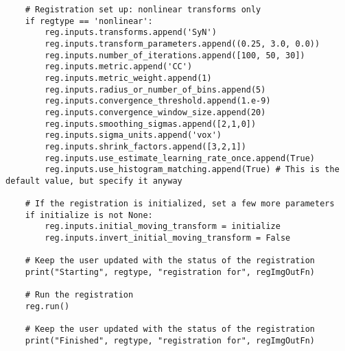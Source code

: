 \begin{lstlisting}
    # Registration set up: nonlinear transforms only
    if regtype == 'nonlinear':
        reg.inputs.transforms.append('SyN')
        reg.inputs.transform_parameters.append((0.25, 3.0, 0.0))
        reg.inputs.number_of_iterations.append([100, 50, 30])
        reg.inputs.metric.append('CC')
        reg.inputs.metric_weight.append(1)
        reg.inputs.radius_or_number_of_bins.append(5)
        reg.inputs.convergence_threshold.append(1.e-9)
        reg.inputs.convergence_window_size.append(20)
        reg.inputs.smoothing_sigmas.append([2,1,0])
        reg.inputs.sigma_units.append('vox')
        reg.inputs.shrink_factors.append([3,2,1])
        reg.inputs.use_estimate_learning_rate_once.append(True)
        reg.inputs.use_histogram_matching.append(True) # This is the default value, but specify it anyway

    # If the registration is initialized, set a few more parameters
    if initialize is not None:
        reg.inputs.initial_moving_transform = initialize
        reg.inputs.invert_initial_moving_transform = False

    # Keep the user updated with the status of the registration
    print("Starting", regtype, "registration for", regImgOutFn)
    
    # Run the registration
    reg.run()
    
    # Keep the user updated with the status of the registration
    print("Finished", regtype, "registration for", regImgOutFn)

\end{lstlisting}
